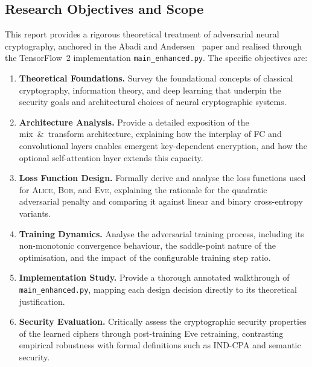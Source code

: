 \documentclass[12pt, a4paper]{article}
\newcommand{\alice}{\textsc{Alice}}
\newcommand{\bob}{\textsc{Bob}}
\newcommand{\eve}{\textsc{Eve}}
\newcommand{\code}[1]{\texttt{\color{CodeRed}#1}}
\begin{document}
\subsection{Research Objectives and Scope}
\label{subsec:objectives}

This report provides a rigorous theoretical treatment of adversarial
neural cryptography, anchored in the Abadi and
Andersen~\cite{abadi2016learning} paper and realised through the
TensorFlow~2 implementation \code{main\_enhanced.py}. The specific
objectives are:

\begin{tcolorbox}[contribbox, title={Research Objectives}]
\begin{enumerate}[leftmargin=1.5em, itemsep=5pt, label=\textbf{O\arabic*.}]
  \item \textbf{Theoretical Foundations.}
        Survey the foundational concepts of classical cryptography,
        information theory, and deep learning that underpin the security
        goals and architectural choices of neural cryptographic systems.

  \item \textbf{Architecture Analysis.}
        Provide a detailed exposition of the mix~\&~transform
        architecture, explaining how the interplay of FC and
        convolutional layers enables emergent key-dependent encryption,
        and how the optional self-attention layer extends this capacity.

  \item \textbf{Loss Function Design.}
        Formally derive and analyse the loss functions used for
        \alice{}, \bob{}, and \eve{}, explaining the rationale for the
        quadratic adversarial penalty and comparing it against linear
        and binary cross-entropy variants.

  \item \textbf{Training Dynamics.}
        Analyse the adversarial training process, including its
        non-monotonic convergence behaviour, the saddle-point nature
        of the optimisation, and the impact of the configurable
        training step ratio.

  \item \textbf{Implementation Study.}
        Provide a thorough annotated walkthrough of
        \code{main\_enhanced.py}, mapping each design decision
        directly to its theoretical justification.

  \item \textbf{Security Evaluation.}
        Critically assess the cryptographic security properties of
        the learned ciphers through post-training Eve retraining,
        contrasting empirical robustness with formal definitions
        such as IND-CPA and semantic security.
\end{enumerate}
\end{tcolorbox}
\end{document}
